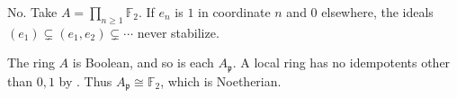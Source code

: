 No. Take $A=\prod_{n\ge1}\mathbb{F}_2$. If $e_n$ is $1$ in coordinate $n$ and $0$ elsewhere, the ideals $(e_1)\subsetneq(e_1,e_2)\subsetneq\cdots$ never stabilize.

The ring $A$ is Boolean, and so is each $A_{\mathfrak{p}}$. A local ring has no idempotents other than $0,1$ by . Thus $A_{\mathfrak{p}}\cong\mathbb{F}_2$, which is Noetherian.
